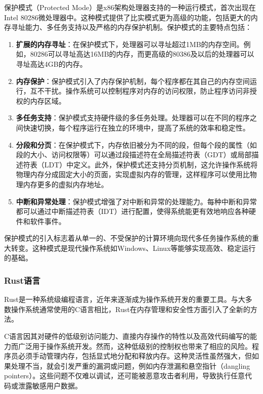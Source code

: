 保护模式（Protected Mode）是x86架构处理器支持的一种运行模式，首次出现在Intel 80286微处理器中。这种模式提供了比实模式更为高级的功能，包括更大的内存寻址能力、多任务支持以及严格的内存保护机制。保护模式的主要特点包括：

\begin{enumerate}
    \item \textbf{扩展的内存寻址}：在保护模式下，处理器可以寻址超过1MB的内存空间。例如，80286可以寻址高达16MB的内存，而更高级的80386及以后的处理器可以寻址高达4GB的内存。
    \item \textbf{内存保护}：保护模式引入了内存保护机制，每个程序都在其自己的内存空间运行，互不干扰。操作系统可以控制程序对内存的访问权限，防止程序访问非授权的内存区域。
    \item \textbf{多任务支持}：保护模式支持硬件级的多任务处理。处理器可以在不同的程序之间快速切换，每个程序运行在独立的环境中，提高了系统的效率和稳定性。
    \item \textbf{分段和分页}：在保护模式下，内存依旧被分为不同的段，但每个段的属性（如段的大小、访问权限等）可以通过段描述符在全局描述符表（GDT）或局部描述符表（LDT）中定义。此外，保护模式还支持分页机制，这允许操作系统将物理内存分成固定大小的页面，实现虚拟内存的管理，这样程序可以使用比物理内存更多的虚拟内存地址。
    \item \textbf{中断和异常处理}：保护模式增强了对中断和异常的处理能力。每种中断和异常都可以通过中断描述符表（IDT）进行配置，使得系统能更有效地响应各种硬件和软件事件。
\end{enumerate}

保护模式的引入标志着从单一的、不受保护的计算环境向现代多任务操作系统的重大转变。这种模式是现代操作系统如Windows、Linux等能够实现高效、稳定运行的基础。

\subsubsection{Rust语言}

Rust是一种系统级编程语言，近年来逐渐成为操作系统开发的重要工具。与大多数操作系统通常使用的C语言相比，Rust在内存管理和安全性方面引入了全新的方法。

C语言因其对硬件的低级别访问能力、直接内存操作的特性以及高效代码编写的能力而广泛用于操作系统开发。然而，这种低级别的控制权也带来了相应的风险。程序员必须手动管理内存，包括显式地分配和释放内存。这种灵活性虽然强大，但如果处理不当，就会引发严重的漏洞或问题，例如内存泄漏和悬空指针（dangling pointers）。这些问题不仅难以调试，还可能被恶意攻击者利用，导致执行任意代码或泄露敏感用户数据。

